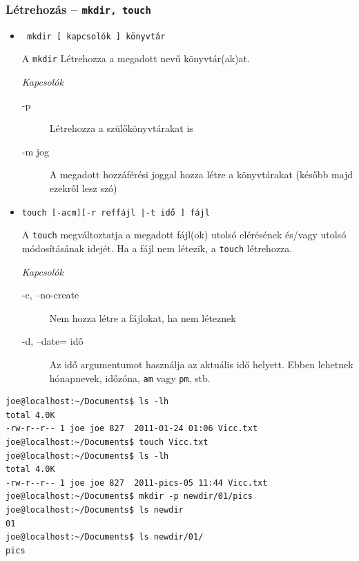 \subsubsection*{Létrehozás -- \texttt{mkdir, touch}}
\begin{itemize}
\item[] 
	\hfill \texttt{ mkdir [  kapcsolók  ]   könyvtár}

A \verb.mkdir. Létrehozza a megadott nevű könyvtár(ak)at. 

\medskip

	\textit{Kapcsolók}
	\begin{description}
	\item[-p] Létrehozza a szülőkönyvtárakat is
	 \item[-m jog] A megadott hozzáférési joggal hozza létre a könyvtárakat (később majd ezekről lesz szó)
	\end{description}

\item[] 
	\hfill\texttt{touch  [-acm][-r   reffájl  |-t   idő  ]   fájl}
	
A \verb.touch. megváltoztatja a megadott fájl(ok) utolsó elérésének és/vagy utolsó módosításának idejét. Ha a fájl nem létezik, a \verb.touch. létrehozza.
\medskip

	\textit{Kapcsolók}
	\begin{description}
	\item[-c, --no-create] Nem hozza létre a fájlokat, ha nem léteznek
	\item[-d, --date= idő] Az idő argumentumot használja az aktuális idő helyett. Ebben lehetnek hónapnevek, időzóna, \texttt{am} vagy \texttt{pm}, stb. 
	\end{description}

\end{itemize}

\begin{lstlisting}
joe@localhost:~/Documents$ ls -lh
total 4.0K
-rw-r--r-- 1 joe joe 827  2011-01-24 01:06 Vicc.txt
joe@localhost:~/Documents$ touch Vicc.txt 
joe@localhost:~/Documents$ ls -lh
total 4.0K
-rw-r--r-- 1 joe joe 827  2011-pics-05 11:44 Vicc.txt
joe@localhost:~/Documents$ mkdir -p newdir/01/pics
joe@localhost:~/Documents$ ls newdir
01
joe@localhost:~/Documents$ ls newdir/01/
pics
\end{lstlisting}




